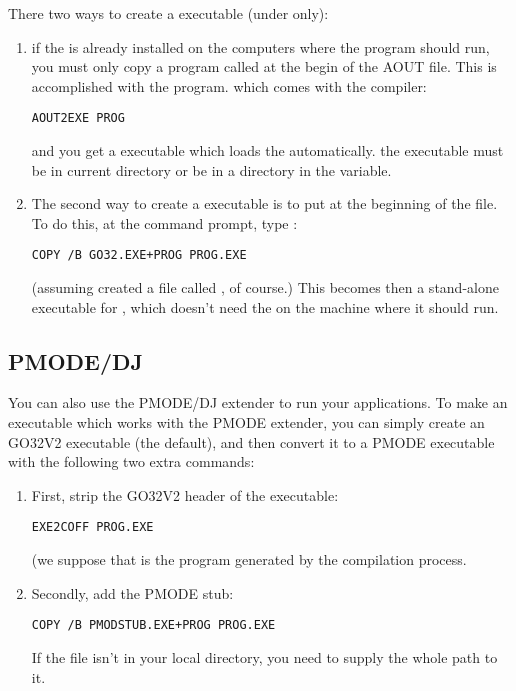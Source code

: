 \documentclass{report}
\begin{document}
There two ways to create a \dos executable (under \dos only): 
\begin{enumerate}
\item if the  is already
installed on the computers where the program should run, you must
only copy a program called  at the begin of
the AOUT file. This is accomplished with the  program. 
which comes with the compiler:
\begin{verbatim}
AOUT2EXE PROG
\end{verbatim}
and you get a \dos executable which loads the  automatically. 
the  executable must be in current directory or be 
in a directory in the  variable.
\item
The second way to create a \dos executable is to put 
 at the beginning of the  file. To do this, at the
command prompt, type :
\begin{verbatim}
COPY /B GO32.EXE+PROG PROG.EXE
\end{verbatim}
(assuming \fpc created a file called , of course.)
This becomes then a stand-alone executable for \dos, which doesn't need the
 on the machine where it should run.
\end{enumerate}

%
%

\subsection{PMODE/DJ}
You can also use the PMODE/DJ extender to run your \fpc applications.
To make an executable which works with the PMODE extender, you can simply
create an GO32V2 executable (the default), and then convert it to a PMODE
executable with the following two extra commands:
\begin{enumerate}
\item First, strip the GO32V2 header of the executable:
\begin{verbatim}
EXE2COFF PROG.EXE
\end{verbatim}
(we suppose that  is the program generated by the compilation
process.
\item Secondly, add the PMODE stub:
\begin{verbatim}
COPY /B PMODSTUB.EXE+PROG PROG.EXE
\end{verbatim}
If the  file isn't in your local directory, you need to
supply the whole path to it.
\end{enumerate}
\end{document}
